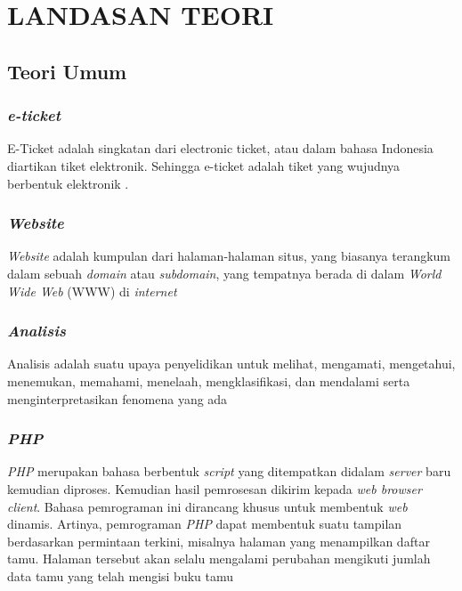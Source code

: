 \chapter{LANDASAN TEORI}
\section{Teori Umum}
\subsection{\textit{e-ticket}}
\par
E-Ticket adalah singkatan dari electronic ticket, atau dalam bahasa Indonesia diartikan tiket elektronik. Sehingga e-ticket adalah tiket yang wujudnya berbentuk elektronik \cite{masuara2015rancang}.
\subsection{\textit{Website}}
\par
\textit{Website} adalah kumpulan dari halaman-halaman situs, yang biasanya terangkum dalam sebuah \textit{domain} atau \textit{subdomain}, yang tempatnya berada di dalam \textit{World Wide Web} (WWW) di \textit{internet} \cite{trimarsiah2017analisis}

\subsection{\textit{Analisis}}
\par
Analisis adalah suatu upaya penyelidikan untuk melihat, mengamati,
mengetahui, menemukan, memahami, menelaah, mengklasifikasi, dan mendalami serta menginterpretasikan fenomena yang ada \cite{astutik2019analisis}


\subsection{\textit{PHP}}
\par
\textit{PHP} merupakan bahasa berbentuk \textit{script} yang ditempatkan didalam \textit{server} baru kemudian diproses. Kemudian hasil pemrosesan dikirim kepada \textit{web browser client}. Bahasa pemrograman ini dirancang khusus untuk membentuk \textit{web} dinamis. Artinya, pemrograman \textit{PHP} dapat membentuk suatu tampilan berdasarkan permintaan terkini, misalnya halaman yang menampilkan daftar tamu. Halaman tersebut akan selalu mengalami perubahan mengikuti jumlah data tamu yang telah mengisi buku tamu \cite{rubiati2018aplikasi}

